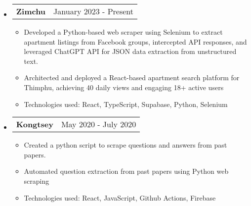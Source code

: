 \documentclass[letterpaper,11pt]{article}
\makeatletter
\newcommand{\resumeItem}[1]{
  \item\small{
    {#1 \vspace{-2pt}}
  }
}
\newcommand{\resumeProjectHeading}[2]{
    \item
    \begin{tabular*}{0.97\textwidth}{l@{\extracolsep{\fill}}r}
      \small#1 & #2 \\
    \end{tabular*}\vspace{-7pt}
}
\newcommand{\resumeSubHeadingListStart}{\begin{itemize}[leftmargin=0.15in, label={}]}
\newcommand{\resumeSubHeadingListEnd}{\end{itemize}}
\newcommand{\resumeItemListStart}{\begin{itemize}}
\newcommand{\resumeItemListEnd}{\end{itemize}\vspace{-5pt}}
\makeatother
\begin{document}
\resumeSubHeadingListStart

\resumeProjectHeading
          {\textbf{Zimchu}}{January 2023 - Present}
          \resumeItemListStart
            \resumeItem{Developed a Python-based web scraper using Selenium to extract apartment listings from Facebook groups, intercepted API responses, and leveraged ChatGPT API for JSON data extraction from unstructured text.}
            \resumeItem{Architected and deployed a React-based apartment search platform for Thimphu, achieving 40 daily views and engaging 18+ active users}
            \resumeItem{Technologies used: React, TypeScript, Supabase, Python, Selenium}
          \resumeItemListEnd

      \resumeProjectHeading
          {\textbf{Kongtsey}}{May 2020 - July 2020}
          \resumeItemListStart
            \resumeItem{Created a python script to scrape questions and answers from past papers.}
            \resumeItem{Automated question extraction from past papers using Python web scraping}
            \resumeItem{Technologies used: React, JavaScript, Github Actions, Firebase}
          \resumeItemListEnd
    \resumeSubHeadingListEnd
\end{document}
